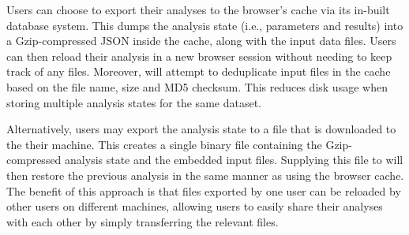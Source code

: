 \documentclass{article}
\begin{document}
Users can choose to export their analyses to the browser's cache via its in-built  database system.
This dumps the analysis state (i.e., parameters and results) into a Gzip-compressed JSON inside the cache, along with the input data files.
Users can then reload their analysis in a new browser session without needing to keep track of any files.
Moreover,  will attempt to deduplicate input files in the cache based on the file name, size and MD5 checksum.
This reduces disk usage when storing multiple analysis states for the same dataset. 

Alternatively, users may export the analysis state to a file that is downloaded to the their machine.
This creates a single binary file containing the Gzip-compressed analysis state and the embedded input files.
Supplying this file to  will then restore the previous analysis in the same manner as using the browser cache.
The benefit of this approach is that files exported by one user can be reloaded by other users on different machines,
allowing users to easily share their analyses with each other by simply transferring the relevant files.



\end{document}
